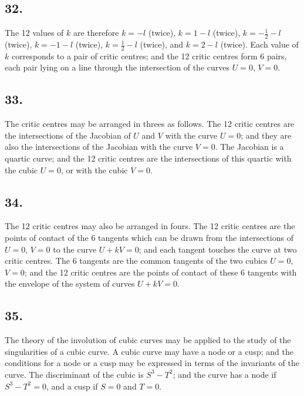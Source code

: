 \documentclass[11pt,a4paper]{article}
\theoremstyle{definition}
\begin{document}
\subsection*{32.}

The 12 values of $k$ are therefore $k = -l$ (twice), $k = 1 - l$ (twice), $k = -\frac{1}{2} - l$ (twice),
$k = -1 - l$ (twice), $k = \frac{1}{2} - l$ (twice), and $k = 2 - l$ (twice). Each value of $k$ corresponds
to a pair of critic centres; and the 12 critic centres form 6 pairs, each pair lying on a line
through the intersection of the curves $U = 0$, $V = 0$.

\newpage
\subsection*{33.}

The critic centres may be arranged in threes as follows. The 12 critic centres are the
intersections of the Jacobian of $U$ and $V$ with the curve $U = 0$; and they are also the
intersections of the Jacobian with the curve $V = 0$. The Jacobian is a quartic curve;
and the 12 critic centres are the intersections of this quartic with the cubic $U = 0$, or with
the cubic $V = 0$.

\subsection*{34.}

The 12 critic centres may also be arranged in fours. The 12 critic centres are the
points of contact of the 6 tangents which can be drawn from the intersections of $U = 0$,
$V = 0$ to the curve $U + kV = 0$; and each tangent touches the curve at two critic centres.
The 6 tangents are the common tangents of the two cubics $U = 0$, $V = 0$; and the 12 critic
centres are the points of contact of these 6 tangents with the envelope of the system of
curves $U + kV = 0$.

\newpage
\subsection*{35.}

The theory of the involution of cubic curves may be applied to the study of the
singularities of a cubic curve. A cubic curve may have a node or a cusp; and the
conditions for a node or a cusp may be expressed in terms of the invariants of the curve.
The discriminant of the cubic is $S^{3} - T^{2}$; and the curve has a node if $S^{3} - T^{2} = 0$, and a cusp
if $S = 0$ and $T = 0$.
\end{document}
